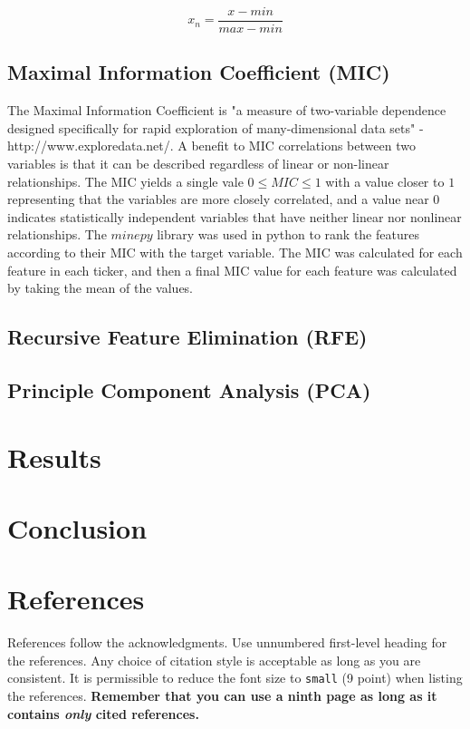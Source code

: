 \documentclass{article}
\begin{document}
\begin{equation}\label{eq:norm}
	x_n = \frac{x - min}{max - min}
\end{equation}


\subsection{Maximal Information Coefficient (MIC)}
The Maximal Information Coefficient is "a measure of two-variable dependence designed specifically for rapid exploration of many-dimensional data sets" - http://www.exploredata.net/. A benefit to MIC correlations between two variables is that it can be described regardless of linear or non-linear relationships. The MIC yields a single vale $0 \leq MIC \leq 1$ with a value closer to $1$ representing that the variables are more closely correlated, and a value near $0$ indicates statistically independent variables that have neither linear nor nonlinear relationships. The $minepy$ library was used in python to rank the features according to their MIC with the target variable. The MIC was calculated for each feature in each ticker, and then a final MIC value for each feature was calculated by taking the mean of the values.

\subsection{Recursive Feature Elimination (RFE)}


\subsection{Principle Component Analysis (PCA)}


\section{Results}
\section{Conclusion}

\section*{References}

References follow the acknowledgments. Use unnumbered first-level
heading for the references. Any choice of citation style is acceptable
as long as you are consistent. It is permissible to reduce the font
size to \verb+small+ (9 point) when listing the references. {\bf
  Remember that you can use a ninth page as long as it contains
  \emph{only} cited references.}
\medskip
\end{document}
